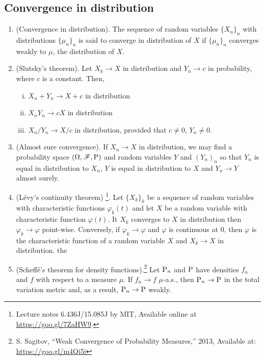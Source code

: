 \documentclass[a4paper,10pt]{scrbook}
\begin{document}
\subsection{Convergence in distribution}
\begin{enumerate}
\item (Convergence in distribution). The sequence of random variables $\{X_n\}_n$ with distributions 
      $\{\mu_n\}_n$ is said to converge in distribution of $X$ if $\{\mu_n\}_n$ converges weakly
      to $\mu$, the distribution of $X$.
      
\item (Slutsky's theorem). Let $X_k\to X$ in distribution and $Y_n\to c$ in probability, where $c$ is a constant.
      Then, 
      \begin{enumerate}[i.]
       \item $X_n + Y_n \to X + c$ in distribution
       \item $X_nY_n \to cX$ in distribution
       \item $X_n/Y_n \to X/c$ in distribution, provided that $c\neq 0$, $Y_n\neq 0$.
      \end{enumerate}
      
\item (Almost sure convergence). If $X_n\to X$ in distribution, we may find a probability space $(\Omega,\mathscr{F},\mathrm{P})$
      and random variables $Y$ and $(Y_n)_n$ so that $Y_n$ is equal in distribution to $X_n$,
      $Y$ is equal in distribution to $X$ and $Y_n\to Y$ almost surely.
      
\item (L{\'e}vy's continuity theorem)%
	  \footnote{Lecture notes 6.436J/15.085J by MIT, Available online at \url{https://goo.gl/7ZaHW9}.}. 
      Let $\{X_k\}_k$ be a sequence of random variables with characteristic functions $\varphi_k(t)$ and let $X$ be a random variable with characteristic function $\varphi(t)$. It $X_k$ converges to $X$ in distribution then $\varphi_k \to \varphi$ point-wise. Conversely, if $\varphi_k \to \varphi$ and $\varphi$ is continuous at $0$, then $\varphi$ is the characteristic function of a random variable $X$ and $X_k\to X$ in distribution.
      the 
\item (Scheff\'e's theorem for density functions).\footnote{S. Sagitov, ``Weak Convergence of Probability Measures,'' 2013, Available at: \url{https://goo.gl/m4Qi5i}}
Let $\mathrm{P}_n$ and $\mathrm{P}$ have densities $f_n$ and $f$
      with respect to a measure $\mu$. If $f_n \to f$ $\mu$-a.s., then $\mathrm{P}_n \to \mathrm{P}$ in the total 
      variation metric and, as a result,  $\mathrm{P}_n \to \mathrm{P}$ weakly.
      

\end{enumerate}
\end{document}
